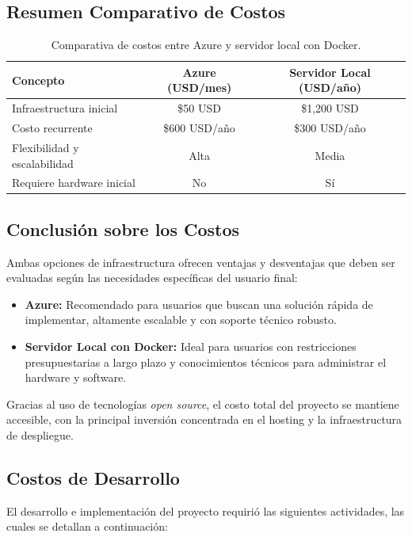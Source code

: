 \subsection{Resumen Comparativo de Costos}
\begin{table}[H]
\centering
\begin{tabular}{|l|c|c|}
\hline
\textbf{Concepto} & \textbf{Azure (USD/mes)} & \textbf{Servidor Local (USD/año)} \\ \hline
Infraestructura inicial & \$50 USD & \$1,200 USD \\ \hline
Costo recurrente & \$600 USD/año & \$300 USD/año \\ \hline
Flexibilidad y escalabilidad & Alta & Media \\ \hline
Requiere hardware inicial & No & Sí \\ \hline
\end{tabular}
\caption{Comparativa de costos entre Azure y servidor local con Docker.}
\end{table}

\subsection{Conclusión sobre los Costos}
Ambas opciones de infraestructura ofrecen ventajas y desventajas que deben ser evaluadas según las necesidades específicas del usuario final:
\begin{itemize}
    \item \textbf{Azure:} Recomendado para usuarios que buscan una solución rápida de implementar, altamente escalable y con soporte técnico robusto.
    \item \textbf{Servidor Local con Docker:} Ideal para usuarios con restricciones presupuestarias a largo plazo y conocimientos técnicos para administrar el hardware y software.
\end{itemize}

Gracias al uso de tecnologías \textit{open source}, el costo total del proyecto se mantiene accesible, con la principal inversión concentrada en el hosting y la infraestructura de despliegue.

\subsection{Costos de Desarrollo}

El desarrollo e implementación del proyecto requirió las siguientes actividades, las cuales se detallan a continuación:


